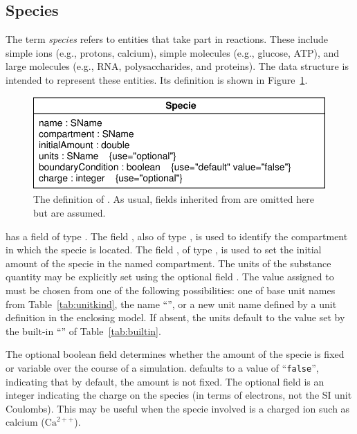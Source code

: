 \documentclass[10pt]{cekarticle}
\newcommand{\vref}[1]{\ref{#1}}
\begin{document}
\subsection{Species}
\label{sec:species}

The term \emph{species} refers to entities that take part in reactions.
These include simple ions (e.g., protons, calcium), simple molecules (e.g.,
glucose, ATP), and large molecules (e.g., RNA, polysaccharides, and
proteins).  The  data structure is intended to represent
these entities.  Its definition is shown in Figure~\vref{fig:specie}.

\begin{figure}[htb]
  \centering
  \includegraphics[scale = 0.68]{specie}
  \caption{The definition of .  As usual, fields inherited from
     are omitted here but are assumed.}
  \label{fig:specie}
\end{figure}

 has a  field of type .  The field
, also of type , is used to identify the
compartment in which the specie is located.  The field
, of type , is used to set the initial
amount of the specie in the named compartment.  The units of the substance
quantity may be explicitly set using the optional field .
The value assigned to  must be chosen from one of the
following possibilities: one of base unit names from
Table~\vref{tab:unitkind}, the name ``'', or a new unit name
defined by a unit definition in the enclosing model.  If absent, the units
default to the value set by the built-in ``'' of
Table~\vref{tab:builtin}.

The optional boolean field  determines whether
the amount of the specie is fixed or variable over the course of a
simulation.   defaults to a value of
``\texttt{false}'', indicating that by default, the amount is not fixed.
The optional field  is an integer indicating the charge on
the species (in terms of electrons, not the SI unit Coulombs).  This may be
useful when the specie involved is a charged ion such as calcium
($\text{Ca}^{2++}$).
\end{document}
